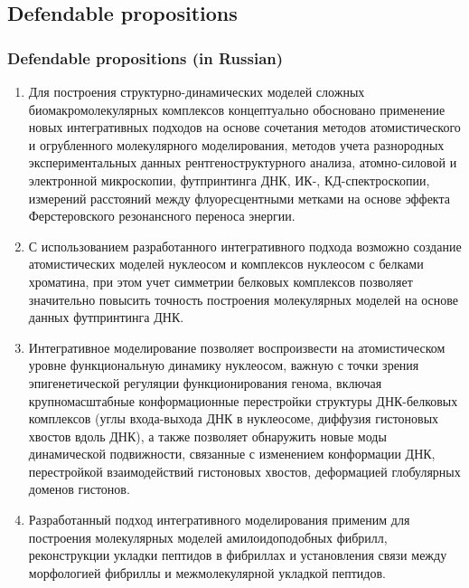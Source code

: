 \normalsize

\subsection{Defendable propositions}
\begin{frame}
    \frametitle{Defendable propositions (in Russian)}
    \scriptsize
    \begin{enumerate}
        \justifying
\item   Для построения структурно-динамических моделей сложных биомакромолекулярных комплексов концептуально обосновано применение новых интегративных подходов на основе сочетания методов атомистического и огрубленного молекулярного моделирования, методов учета разнородных экспериментальных данных рентгеноструктурного анализа, атомно-силовой и электронной микроскопии, футпринтинга ДНК, ИК-, КД-спектроскопии, измерений расстояний между флуоресцентными метками на основе эффекта Ферстеровского резонансного переноса энергии.
\item   С использованием разработанного интегративного подхода возможно создание атомистических моделей нуклеосом и комплексов нуклеосом с белками хроматина, при этом учет симметрии белковых комплексов позволяет значительно повысить точность построения молекулярных моделей на основе данных футпринтинга ДНК.
\item   Интегративное моделирование позволяет воспроизвести на атомистическом уровне функциональную динамику нуклеосом, важную с точки зрения эпигенетической регуляции функционирования генома, включая крупномасштабные конформационные перестройки структуры ДНК-белковых комплексов (углы входа-выхода ДНК в нуклеосоме, диффузия гистоновых хвостов вдоль ДНК), а также позволяет обнаружить новые моды динамической подвижности, связанные с изменением конформации ДНК, перестройкой взаимодействий гистоновых хвостов, деформацией глобулярных доменов гистонов.
\item   Разработанный подход интегративного моделирования применим для построения молекулярных моделей амилоидоподобных фибрилл, реконструкции укладки пептидов в фибриллах и установления связи между морфологией фибриллы и межмолекулярной укладкой пептидов.
    \end{enumerate}
\end{frame}
\normalsize
{}
